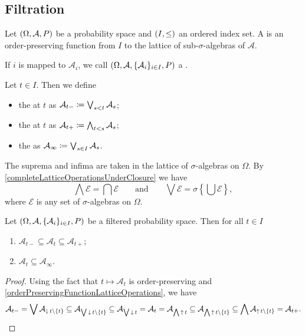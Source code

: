 \subsection{Filtration}
\begin{definition}
Let  $\sSet{\Omega, \mathcal{A}, P}$ be a probability space and $\sSet{I,\leq}$ an ordered index set. A  is an order-preserving function from $I$ to the lattice of sub-$\sigma$-algebras of $\mathcal{A}$.

If $i$ is mapped to $\mathcal{A}_i$, we call $\sSet{\Omega, \mathcal{A}, \{\mathcal{A}_i\}_{i\in I}, P}$ a .

Let $t\in I$. Then we define
\begin{itemize}
\item the  at $t$ as $\mathcal{A}_{t-} \coloneqq \bigvee_{s<t}\mathcal{A}_s$;
\item the  at $t$ as $\mathcal{A}_{t+} \coloneqq \bigwedge_{t<s}\mathcal{A}_s$;
\item the  as $\mathcal{A}_{\infty} \coloneqq \bigvee_{s\in I}\mathcal{A}_s$.
\end{itemize}
\end{definition}
The suprema and infima are taken in the lattice of $\sigma$-algebras on $\Omega$. By \ref{completeLatticeOperationsUnderClosure} we have
\[ \bigwedge\mathcal{E} = \bigcap\mathcal{E} \qquad\text{and}\qquad \bigvee\mathcal{E} = \sigma\left\{\bigcup \mathcal{E}\right\},  \]
where $\mathcal{E}$ is any set of $\sigma$-algebras on $\Omega$.

\begin{lemma}
Let $\sSet{\Omega, \mathcal{A}, \{\mathcal{A}_i\}_{i\in I}, P}$ be a filtered probability space. Then for all $t\in I$
\begin{enumerate}
\item $\mathcal{A}_{t-} \subseteq \mathcal{A}_{t} \subseteq \mathcal{A}_{t+}$;
\item $\mathcal{A}_{t} \subseteq \mathcal{A}_{\infty}$.
\end{enumerate}
\end{lemma}
\begin{proof}
Using the fact that $t\mapsto \mathcal{A}_t$ is order-preserving and \ref{orderPreservingFunctionLatticeOperations}, we have
\[ \mathcal{A}_{t-} = \bigvee\mathcal{A}_{\operatorname{\downarrow} t \setminus\{t\}} \subseteq \mathcal{A}_{\bigvee \operatorname{\downarrow} t \setminus\{t\}} \subseteq \mathcal{A}_{\bigvee \operatorname{\downarrow} t} = \mathcal{A}_t = \mathcal{A}_{\bigwedge \operatorname{\uparrow} t} \subseteq \mathcal{A}_{\bigwedge \operatorname{\uparrow} t \setminus\{t\}} \subseteq \bigwedge \mathcal{A}_{\operatorname{\uparrow} t \setminus\{t\}} = \mathcal{A}_{t+}. \]
\end{proof}

